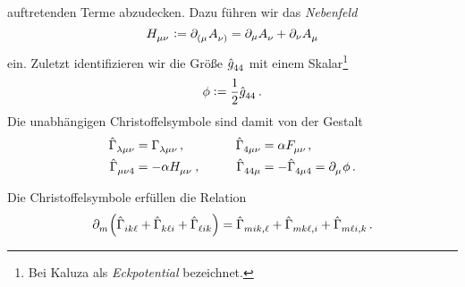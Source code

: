 auftretenden Terme abzudecken. Dazu führen wir das \emph{Nebenfeld}
\begin{equation}
\tensor{H}{_\mu_\nu}:=\tensor{\partial}{_{(\mu}}\tensor{A}{_{\nu)}}=\partial_\mu\tensor{A}{_\nu}+\partial_\nu\tensor{A}{_\mu}
\end{equation}
ein. Zuletzt identifizieren wir die Größe $\tensor{\hat{g}}{_4_4}$  mit einem
Skalar\footnote{Bei Kaluza als \emph{Eckpotential} bezeichnet.}
\begin{equation}
\phi:=\frac{1}{2}\tensor{\hat{g}}{_4_4}\,.
\end{equation}
Die unabhängigen Christoffelsymbole sind damit von der Gestalt
\begin{equation}
  \begin{alignedat}{2}
    \tensor*{\hat{\Gamma}}{_\lambda_\mu_\nu}&=\tensor*{\Gamma}{_\lambda_\mu_\nu}\,,
    & \qquad \tensor*{\hat{\Gamma}}{_4_\mu_\nu}&=\alpha\tensor{F}{_\mu_\nu},\\
    \tensor*{\hat{\Gamma}}{_\mu_\nu_4}&=-\alpha \tensor{H}{_\mu_\nu}\,,&
    \qquad\quad\tensor*{\hat{\Gamma}}{_4_4_\mu}&=-\tensor*{\hat{\Gamma}}{_4_\mu_4}=\tensor{\partial}{_\mu}\phi\,.
  \end{alignedat}
\end{equation}
\begin{lemma}
\label{lemma:Christrel}
Die Christoffelsymbole erfüllen die Relation
\begin{equation}
\pdif{_m}\left(\tensor*{\hat{\Gamma}}{_i_k_\ell}+\tensor*{\hat{\Gamma}}{_k_\ell_i}+\tensor*{\hat{\Gamma}}{_\ell_i_k}\right)
=\tensor*{\hat{\Gamma}}{_m_i_k_{,\ell}}+\tensor*{\hat{\Gamma}}{_m_k_\ell_{,i}}+\tensor*{\hat{\Gamma}}{_m_\ell_i_{,k}}\,.
\end{equation}
\end{lemma}
